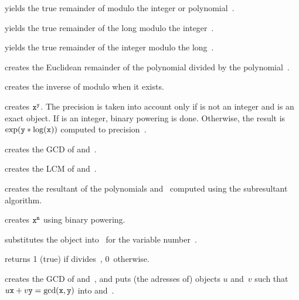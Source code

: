  yields the true remainder of 
modulo the integer or polynomial~.

 yields the true remainder of the
long  modulo the integer~.

 yields the true remainder of the
integer  modulo the long~.

 creates the Euclidean remainder of the
polynomial  divided by the polynomial~.

 creates the inverse of  modulo 
when it exists.

 creates ${\tt x}^{{\tt y}}$. The
precision  is taken into account only if  is not an integer
and  is an exact object. If  is an integer, binary powering
is done. Otherwise, the result is $\exp({\tt y}*\log({\tt x}))$ computed
to precision~.

 creates the GCD of  and~.

 creates the LCM of  and~.

 creates the resultant of the polynomials
 and~ computed using the subresultant algorithm.

 creates ${\tt x}^{{\tt n}}$ using
binary powering.

 substitutes the object 
into~ for the variable number~.

  returns 1 (true) if  divides~,
0~otherwise.

 creates the GCD of 
and~, and puts (the adresses of) objects $u$ and~$v$ such that
$u{\tt x}+v{\tt y}=\gcd({\tt x},{\tt y})$ into  and~.
\vfill\eject
